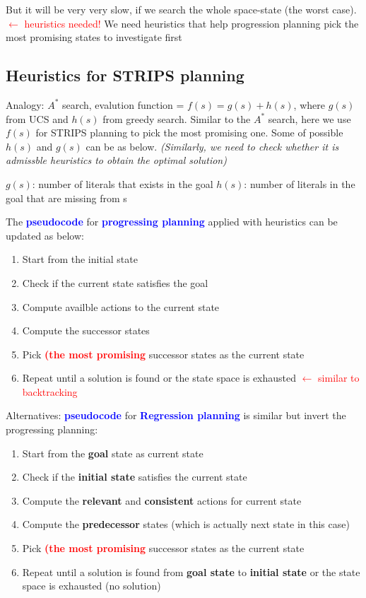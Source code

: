 \noindent
But it will be very very slow, if we search the whole space-state (the worst case). \textcolor{red}{$\leftarrow$ heuristics needed!} We need heuristics that help progression planning pick the most promising states to investigate first

\subsection{Heuristics for STRIPS planning}
Analogy: $A^{*}$ search, evalution function = $f(s) = g(s) + h(s)$, where $g(s)$ from UCS and $h(s)$ from greedy search. Similar to the $A^{*}$ search, here we use $f(s)$ for STRIPS planning to pick the most promising one. Some of possible $h(s)$ and $g(s)$ can be as below. \emph{(Similarly, we need to check whether it is admissble heuristics to obtain the optimal solution)}
\begin{outline}
    \1 $g(s)$: number of literals that exists in the goal
    \1 $h(s)$: number of literals in the goal that are missing from s
\end{outline}

\noindent
The \textcolor{blue}{\textbf{pseudocode}} for \textcolor{blue}{\textbf{progressing planning}} applied with heuristics can be updated as below:
\begin{enumerate}
    \item Start from the initial state
    \item Check if the current state satisfies the goal
    \item Compute availble actions to the current state
    \item Compute the successor states
    \item Pick \textcolor{red}{\textbf{(the most promising}} successor states as the current state
    \item Repeat until a solution is found or the state space is exhausted \textcolor{red}{$\leftarrow$ similar to backtracking}
\end{enumerate}

\noindent
Alternatives: \textcolor{blue}{\textbf{pseudocode}} for \textcolor{blue}{\textbf{Regression planning }} is similar but invert the progressing planning:
\begin{enumerate}
    \item Start from the \textbf{goal} state as current state
    \item Check if the \textbf{initial state} satisfies the current state
    \item Compute the \textbf{relevant} and \textbf{consistent} actions for current state
    \item Compute the \textbf{predecessor} states (which is actually next state in this case)
    \item Pick \textcolor{red}{\textbf{(the most promising}} successor states as the current state
    \item Repeat until a solution is found from \textbf{goal state} to \textbf{initial state} or the state space is exhausted (no solution)
\end{enumerate}

